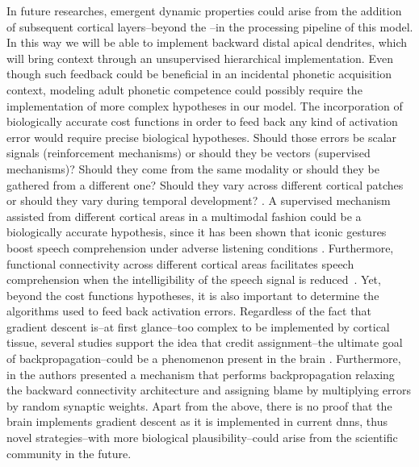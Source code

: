 {In future researches, emergent dynamic properties could arise from the addition of subsequent cortical layers--beyond the --in the processing pipeline of this model.  In this way we will be able to implement backward distal apical dendrites, which will bring context through an unsupervised hierarchical implementation. Even though such feedback could be beneficial in an incidental phonetic acquisition context, modeling adult phonetic competence could possibly require the implementation of more complex hypotheses in our model. The incorporation of biologically accurate cost functions in order to feed back any kind of activation error would require precise biological hypotheses. Should those errors be scalar signals (reinforcement mechanisms) or should they be vectors (supervised mechanisms)? Should they come from the same modality or should they be gathered from a different one? Should they vary across different cortical patches or should they vary during temporal development? \cite{10.3389/fncom.2016.00094}. A supervised mechanism assisted from different cortical areas in a multimodal fashion could be a biologically accurate hypothesis, since it has been shown that iconic gestures boost speech comprehension under adverse listening conditions \cite{HOLLE2010875}. Furthermore, functional connectivity across different cortical areas facilitates speech comprehension when the intelligibility of the speech signal is reduced~\cite{Obleser2283}. Yet, beyond the cost functions hypotheses, it is also important to determine the algorithms used to feed back activation errors. Regardless of the fact that gradient descent is--at first glance--too complex to be implemented by cortical tissue, several studies support the idea that credit assignment--the ultimate goal of backpropagation--could be a phenomenon present in the brain \cite{Guerguiev2017TowardsDL}. Furthermore, in \cite{Lillicrap_2016} the authors presented a mechanism that performs backpropagation relaxing the backward connectivity architecture and assigning blame by multiplying errors by random synaptic weights. Apart from the above, there is no proof that the brain implements gradient descent as it is implemented in current \glspl{dnn}, thus novel strategies--with more biological plausibility--could arise from the scientific community in the future.

}
